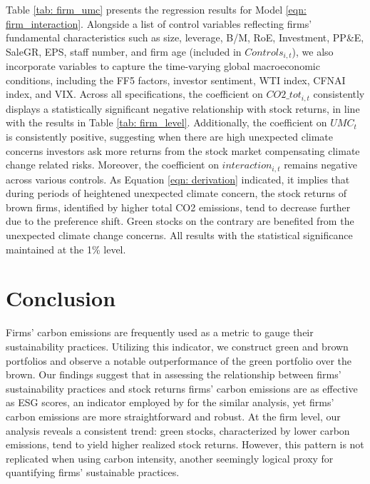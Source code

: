\documentclass[12pt]{article}
\begin{document}
Table \ref{tab: firm_umc} presents the regression results for Model \ref{eqn: firm_interaction}. Alongside a list of control variables reflecting firms' fundamental characteristics such as size, leverage, B/M, RoE, Investment, PP\&E, SaleGR, EPS, staff number, and firm age (included in $Controls_{i, t}$), we also incorporate variables to capture the time-varying global macroeconomic conditions, including the FF5 factors, investor sentiment, WTI index, CFNAI index, and VIX. Across all specifications, the coefficient on $CO2\_tot_{i,t}$ consistently displays a statistically significant negative relationship with stock returns, in line with the results in Table \ref{tab: firm_level}. Additionally, the coefficient on $UMC_t$ is consistently positive, suggesting when there are high unexpected climate concerns investors ask more returns from the stock market compensating climate change related risks. Moreover, the coefficient on $interaction_{i,t}$ remains negative across various controls. As Equation \ref{eqn: derivation} indicated, it implies that during periods of heightened unexpected climate concern, the stock returns of brown firms, identified by higher total CO2 emissions, tend to decrease further due to the preference shift. Green stocks on the contrary are benefited from the unexpected climate change concerns. All results with the statistical significance maintained at the 1\% level.
\section{Conclusion} \label{sec:conclusion}

Firms' carbon emissions are frequently used as a metric to gauge their sustainability practices. Utilizing this indicator, we construct green and brown portfolios and observe a notable outperformance of the green portfolio over the brown. Our findings suggest that in assessing the relationship between firms' sustainability practices and stock returns firms' carbon emissions are as effective as ESG scores, an indicator employed by \citet{pastor2022dissecting} for the similar analysis, yet firms' carbon emissions are more straightforward and robust. At the firm level, our analysis reveals a consistent trend: green stocks, characterized by lower carbon emissions, tend to yield higher realized stock returns. However, this pattern is not replicated when using carbon intensity, another seemingly logical proxy for quantifying firms' sustainable practices.
\end{document}
